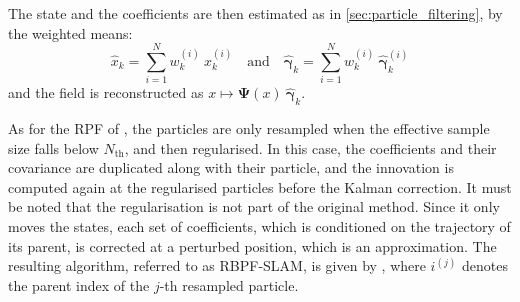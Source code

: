 The state and the coefficients are then estimated as in \cref{sec:particle_filtering}, by the weighted means:
\begin{equation}
	\hat{x}_k=\sum_{i=1}^Nw_k^{(i)}\:x_k^{(i)}\quad\text{and}\quad\hat{\boldsymbol{\gamma}}_k=\sum_{i=1}^Nw_k^{(i)}\:\hat{\boldsymbol{\gamma}}_k^{(i)}
\end{equation}
and the field is reconstructed as $x\mapsto\boldsymbol{\Psi}(x)\:\hat{\boldsymbol{\gamma}}_k$.

As for the RPF of , the particles are only resampled when the effective sample size falls below $N_{\mathrm{th}}$, and then regularised. In this case, the coefficients and their covariance are duplicated along with their particle, and the innovation is computed again at the regularised particles before the Kalman correction. It must be noted that the regularisation is not part of the original method. Since it only moves the states, each set of coefficients, which is conditioned on the trajectory of its parent, is corrected at a perturbed position, which is an approximation. The resulting algorithm, referred to as RBPF-SLAM, is given by , where $i^{(j)}$ denotes the parent index of the $j$-th resampled particle.

